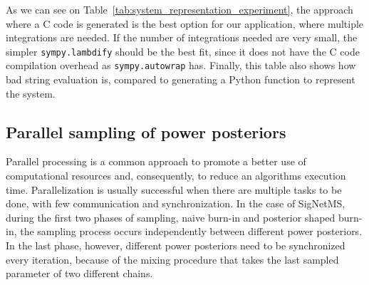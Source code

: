 As we can see on Table~\ref{tab:system_representation_experiment}, the
approach where a C code is generated  is the best option for our 
application, where multiple integrations are needed. If the number of 
integrations needed are very small, the simpler {\tt sympy.lambdify} 
should be the best fit, since it does not have the C code compilation 
overhead as {\tt sympy.autowrap} has. Finally, this table also shows how
bad string evaluation is, compared to generating a Python function to
represent the system. 

\subsection{Parallel sampling of power posteriors}
Parallel processing is a common approach to promote a better use of
computational resources and, consequently, to reduce an algorithms
execution time. Parallelization is usually successful when there are
multiple tasks to be done, with few communication and synchronization.
In the case of SigNetMS, during the first two phases of sampling, naive
burn-in and posterior shaped burn-in, the sampling process occurs
independently between different power posteriors. In the last phase,
however, different power posteriors need to be synchronized every
iteration, because of the mixing procedure that takes the last sampled
parameter of two different chains. 

%

